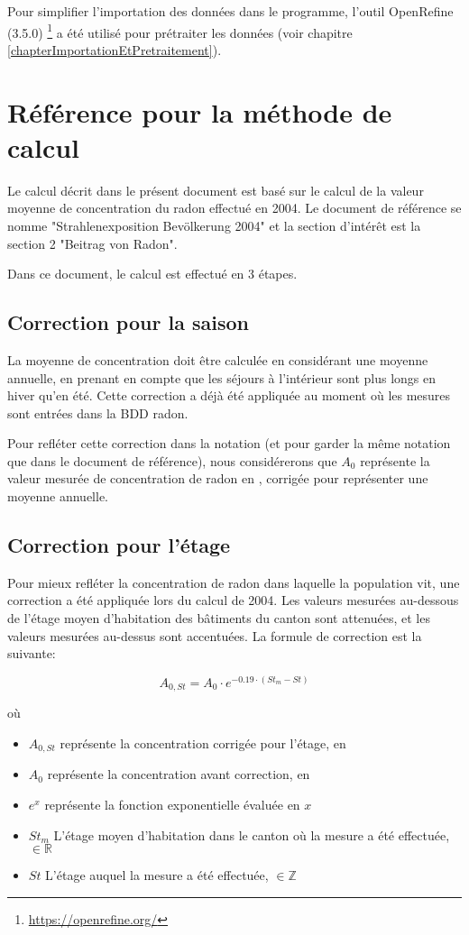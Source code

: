 Pour simplifier l'importation des données dans le programme, l'outil OpenRefine (3.5.0) \footnote{\url{https://openrefine.org/}} a été utilisé pour prétraiter les données (voir chapitre \ref{chapterImportationEtPretraitement}).

\section{Référence pour la méthode de calcul}\label{sectionReferenceCalcul}
Le calcul décrit dans le présent document est basé sur le calcul de la valeur moyenne de concentration du radon effectué en 2004. Le document de référence se nomme "Strahlenexposition Bevölkerung 2004" et la section d'intérêt est la section 2 "Beitrag von Radon". 

Dans ce document, le calcul est effectué en 3 étapes.
\subsection{Correction pour la saison}
La moyenne de concentration doit être calculée en considérant une moyenne annuelle, en prenant en compte que les séjours à l'intérieur sont plus longs en hiver qu'en été. Cette correction a déjà été appliquée au moment où les mesures sont entrées dans la BDD radon. 

Pour refléter cette correction dans la notation (et pour garder la même notation que dans le document de référence), nous considérerons que $A_0$ représente la valeur mesurée de concentration de radon en \bqmc, corrigée pour représenter une moyenne annuelle.

\subsection{Correction pour l'étage} \label{introCorrectionEtage}
Pour mieux refléter la concentration de radon dans laquelle la population vit, une correction a été appliquée lors du calcul de 2004. Les valeurs mesurées au-dessous de l'étage moyen d'habitation des bâtiments du canton sont attenuées, et les valeurs mesurées au-dessus sont accentuées. La formule de correction est la suivante:

\begin{equation}\label{formuleCorrectionEtage}
A_{0,St} = A_0 \cdot e^{-0.19 \cdot (St_m - St)}
\end{equation}

où

\begin{itemize}
\item $A_{0,St}$ représente la concentration corrigée pour l'étage, en \bqmc
\item $A_0$ représente la concentration avant correction, en \bqmc
\item $e^x$ représente la fonction exponentielle évaluée en $x$
\item $St_m$ L'étage moyen d'habitation dans le canton où la mesure a été effectuée, $\in \mathbb{R}$
\item $St$ L'étage auquel la mesure a été effectuée, $\in \mathbb{Z}$
\end{itemize}

